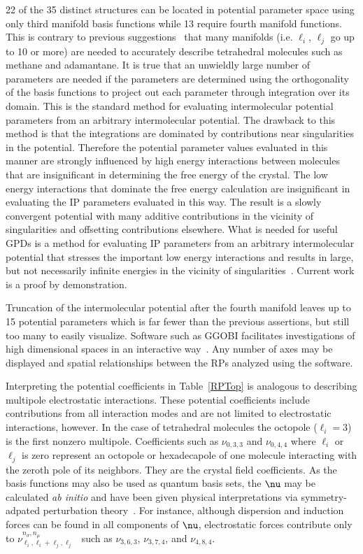 \documentclass[preprint]{iucr}              %
\newcommand{\mb}[1]{\ensuremath{\mbox{\boldmath $ #1 $}}}
\begin{document}
22 of the 35 distinct structures can be located in potential
parameter space using only third manifold basis functions while 13
require fourth manifold functions. This is contrary to previous
suggestions~\cite{Briels80} that many manifolds (i.e. $\ell_i$,  $\ell_j$ go up
to 10 or more)  are needed to
accurately describe tetrahedral molecules such as methane and
adamantane. It is true that an unwieldly large number of parameters are needed
if the parameters are determined using the orthogonality of the basis functions
to project out each parameter through integration over its domain.  This is the
standard method for evaluating intermolecular potential parameters from an
arbitrary intermolecular potential.  The drawback to this method is that the
integrations are dominated by contributions near singularities in the potential.
 Therefore the potential parameter values evaluated in this manner are strongly
influenced by high energy interactions between molecules that are insignificant
in determining the free energy of the crystal.  The low energy interactions that
dominate the free energy calculation are insignificant in evaluating the IP
parameters evaluated in this way.  The result is a slowly convergent potential
with many additive contributions in the vicinity of singularities and offsetting
contributions elsewhere.  What is needed for useful GPDs is a method for
evaluating IP parameters from an arbitrary intermolecular potential that
stresses the important low energy interactions and results in large, but not
necessarily infinite energies in the vicinity of
singularities~\cite{Missaghi09}.  Current work is a proof by demonstration.

Truncation of the intermolecular potential after the fourth manifold leaves up
to 15 potential parameters which is far fewer than the previous assertions, but
still too many to easily visualize.  Software such as {G\footnotesize GOBI}
facilitates investigations of high dimensional spaces in an
interactive way~\cite{ggobi03}.  Any number of axes may be displayed and
spatial relationships between the RPs analyzed using the software.

Interpreting the potential coefficients in Table~\ref{RPTop} is
analogous to describing multipole electrostatic interactions. These potential
coefficients include contributions from all interaction modes and are not
limited
to electrostatic  interactions, however. In the case of tetrahedral molecules
the octopole ($\ell_i=3$) is the first nonzero multipole.
Coefficients such as $\nu_{0,3,3}$ and $\nu_{0,4,4}$ where $\ell_i$
or $\ell_j$ is zero represent an octopole or hexadecapole of one molecule
interacting with the zeroth pole of its neighbors.  They are the crystal field
coefficients. As the basis functions may also be used as quantum
basis sets, the $\mb{\nu}$ may be calculated \emph{ab initio} and
have been given physical interpretations via symmetry-adpated
perturbation theory~\cite{Avoird94}.  For instance, although
dispersion and induction forces can be found in all components of
$\mb{\nu}$, electrostatic forces contribute only to
$\nu^{n_\sigma,n_\mu}_{\ell_i,\ell_i+\ell_j,\ell_j}$~\cite{Stone84}
such as $\nu_{3,6,3}$, $\nu_{3,7,4}$, and $\nu_{4,8,4}$.
\end{document}
